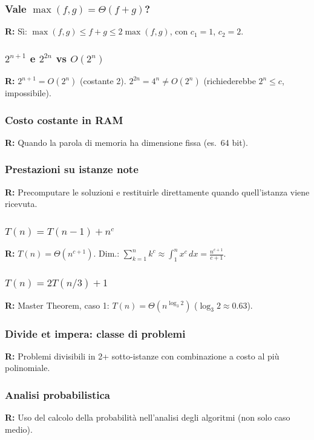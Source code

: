 \documentclass[a4paper, 11pt]{article}
\theoremstyle{definition}
\theoremstyle{remark}
\theoremstyle{remark}
\begin{document}
	\subsubsection*{\texorpdfstring{Vale $\max(f,g) = \Theta(f+g)$?}%
		{Vale max(f,g) = Theta(f+g)?}}
	\textbf{R:} Sì: $\max(f,g) \le f+g \le 2\max(f,g)$, con $c_1=1$, $c_2=2$.
	
	\subsubsection*{\texorpdfstring{$2^{n+1}$ e $2^{2n}$ vs $O(2^n)$}%
		{2n+1 e 22n vs O(2n)}}
	\textbf{R:} $2^{n+1} = O(2^n)$ (costante 2). $2^{2n} = 4^n \neq O(2^n)$
	(richiederebbe $2^n \le c$, impossibile).
	
	\subsubsection*{Costo costante in RAM}
	\textbf{R:} Quando la parola di memoria ha dimensione fissa (es.\ 64 bit).
	
	\subsubsection*{Prestazioni su istanze note}
	\textbf{R:} Precomputare le soluzioni e restituirle direttamente
	quando quell'istanza viene ricevuta.
	
	\subsubsection*{\texorpdfstring{$T(n)=T(n-1)+n^c$}{T(n)=T(n-1)+nc}}
	\textbf{R:} $T(n) = \Theta(n^{c+1})$.
	Dim.: $\sum_{k=1}^n k^c \approx \int_1^n x^c\,dx = \frac{n^{c+1}}{c+1}$.
	
	\subsubsection*{\texorpdfstring{$T(n)=2T(n/3)+1$}{T(n)=2T(n/3)+1}}
	\textbf{R:} Master Theorem, caso 1: $T(n) = \Theta(n^{\log_3 2})$
	($\log_3 2 \approx 0.63$).
	
	\subsubsection*{Divide et impera: classe di problemi}
	\textbf{R:} Problemi divisibili in 2+ sotto-istanze con combinazione
	a costo al più polinomiale.
	
	\subsubsection*{Analisi probabilistica}
	\textbf{R:} Uso del calcolo della probabilità nell'analisi degli algoritmi
	(non solo caso medio).
	
\end{document}
